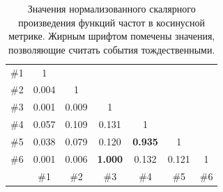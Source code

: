 \documentclass[12pt, a4paper]{article}
\begin{document}
	\begin{table}[H]
	\centering
	\begin{tabular}{ r  c  c  c  c  c  c }
	\hline
	\#1 & 1 &  &  &  &  &  \\ 
	\#2 & 0.004 & 1 &  &  &  &  \\ 
	\#3 & 0.001 & 0.009 & 1 &  &  &  \\ 
	\#4 & 0.057 & 0.109 & 0.131 & 1 &  &  \\ 
	\#5 & 0.038 & 0.079 & 0.120 & \textbf{0.935} & 1 &  \\ 
	\#6 & 0.001 & 0.006 & \textbf{1.000} & 0.132 & 0.121 & 1 \\ \hline
	& \#1 & \#2 & \#3 & \#4 & \#5 & \#6 \\
	\end{tabular}
	\caption{Значения нормализованного скалярного произведения функций частот в косинусной метрике. Жирным шрифтом помечены значения, позволяющие считать события тождественными.}
	\end{table}
	
\end{document}
